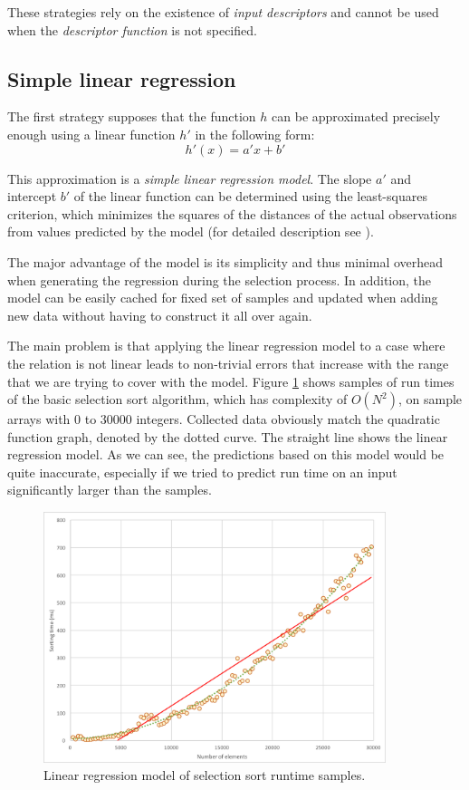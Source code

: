 These strategies rely on the existence of \textit{input descriptors} and cannot be used when the \textit{descriptor function} is not specified.

\subsection{Simple linear regression}
\label{subsec:simple_linear_regression}

The first strategy supposes that the function \(h\) can be approximated precisely enough using a linear function \(h'\) in the following form:
\[h'(x) = a' x + b'\]

This approximation is a \textit{simple linear regression model}. The slope \(a'\) and intercept \(b'\) of the linear function can be determined using the least-squares criterion, which minimizes the squares of the distances of the actual observations from values predicted by the model (for detailed description see \cite{weiss_introductory_2010}).

The major advantage of the model is its simplicity and thus minimal overhead when generating the regression during the selection process. In addition, the model can be easily cached for fixed set of samples and updated when adding new data without having to construct it all over again.

The main problem is that applying the linear regression model to a case where the relation is not linear leads to non-trivial errors that increase with the range that we are trying to cover with the model. Figure \ref{fig:selection_sort_linear_trendline} shows samples of run times of the basic selection sort algorithm, which has complexity of \(O(N^2)\), on sample arrays with 0 to 30000 integers. Collected data obviously match the quadratic function graph, denoted by the dotted curve. The straight line shows the linear regression model. As we can see, the predictions based on this model would be quite inaccurate, especially if we tried to predict run time on an input significantly larger than the samples.

\begin{figure}[h!]
	\captionsetup{justification=centering,margin=0.5cm}
	\centerline{\mbox{\includegraphics[width=100mm]{./img/selection_sort_linear_trendline.png}}}
	\caption{Linear regression model of selection sort runtime samples.}
	\label{fig:selection_sort_linear_trendline}
\end{figure}

